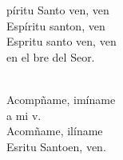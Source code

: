 \begin{cancion}%
	\begin{chorus}%
	píritu Santo ven, ven\\
	Espíritu santon, ven\\
	Espritu santo ven, ven\\
	en el bre del Seor.\\
	\end{chorus}%
	\jump\\
	Acompñame, imíname\\
	a mi v.\\
	Acomñame, ilíname \\
	Esritu Santoen, ven.\\
\end{cancion}%
